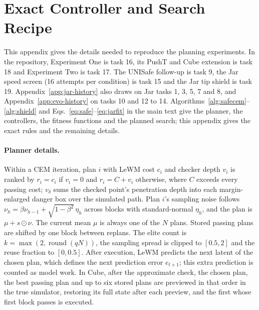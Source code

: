 \documentclass[sigconf,nonacm]{acmart}
\begin{document}


\onecolumn
\appendix
\section{Exact Controller and Search Recipe}\label{app:recipe}
This appendix gives the details needed to reproduce the planning
experiments. In the repository, Experiment One is task 16, its PushT and
Cube extension is task 18 and Experiment Two is task 17. The UNISafe
follow-up is task 9, the Jar speed screen (16 attempts per condition) is task 15 and the Jar
tip shield is task 19. Appendix~\ref{app:jar-history} also draws on Jar
tasks 1, 3, 5, 7 and 8, and Appendix~\ref{app:evo-history} on tasks 10 and
12 to 14. Algorithms~\ref{alg:safecem}--\ref{alg:shield} and
Eqs.~\ref{eq:safe}--\ref{eq:jarfit} in the main text give the planner, the
controllers, the fitness functions and the planned search; this appendix gives the exact rules
and the remaining details.

\paragraph{Planner details.} Within a CEM iteration, plan $i$ with LeWM
cost $c_i$ and checker depth $v_i$ is ranked by $r_i=c_i$ if $v_i=0$ and
$r_i=C+v_i$ otherwise, where $C$ exceeds every passing cost; $v_\delta$ sums
the checked point's penetration depth into each margin-enlarged danger box
over the simulated path. Plan $i$'s sampling noise follows
$\nu_{h}=\beta\nu_{h-1}+\sqrt{1-\beta^2}\,\eta_h$ across blocks with
standard-normal $\eta_h$, and the plan is $\mu+s\odot\nu$. The current mean
$\mu$ is always one of the $N$ plans. Stored passing plans are shifted by
one block between replans. The elite count is $k=\max(2,\operatorname{round}(qN))$,
the sampling spread is clipped to $[0.5,2]$ and the reuse fraction to
$[0,0.5]$. After execution, LeWM predicts the next latent of the chosen
plan, which defines the next prediction error $e_{t+1}$; this extra
prediction is counted as model work. In Cube, after the approximate check,
the chosen plan, the best passing plan and up to six stored plans are
previewed in that order in the true simulator, restoring its full state
after each preview, and the first whose first block passes is executed.
\end{document}
